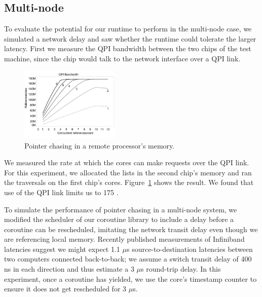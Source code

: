 \documentclass[10pt,nocopyrightspace,preprint]{sigplanconf}
\begin{document}
\subsection{Multi-node}

To evaluate the potential for our runtime to perform in the multi-node case, we simulated a network delay and saw whether the runtime could tolerate the larger latency. First we measure the QPI bandwidth between the two chips of the test machine, since the chip would talk to the network interface over a QPI link.

\begin{figure}[h]
  \begin{center}
    \includegraphics[width=0.42\textwidth]{figures/qpi_bw-edited.pdf}
  \end{center}
  \caption{Pointer chasing in a remote processor's memory.}
  \label{fig:listwalk-qpi}
\end{figure}

We measured the rate at which the cores can make requests
over the QPI link. For this experiment, we allocated the lists in the
second chip's memory and ran the traversals on the first chip's cores. Figure~\ref{fig:listwalk-qpi} shows the result. We found that use of the QPI link limits us to 175 \mrps.


To simulate the performance of pointer chasing in a
multi-node system, we modified the scheduler of our coroutine library
to include a delay before a coroutine can be rescheduled, imitating
the network transit delay even though we are referencing local
memory. Recently published measurements of Infiniband latencies
 suggest we might expect 1.1 $\mu$s source-to-destination
latencies between two computers connected back-to-back; we assume a
switch transit delay of 400 ns  in each direction and thus estimate a 3
$\mu$s round-trip delay. In this experiment, once a coroutine has
yielded, we use the core's timestamp counter to ensure it does not get
rescheduled for 3 $\mu$s.
\end{document}
